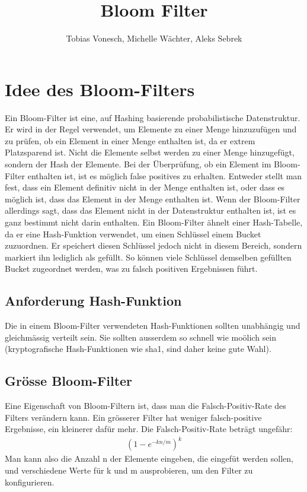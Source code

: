 \documentclass[11pt]{article}
\title{Bloom Filter}
\author{Tobias Vonesch, Michelle Wächter, Aleks Sebrek}
\begin{document}
    \maketitle

    \section{Idee des Bloom-Filters}

    Ein Bloom-Filter ist eine, auf Hashing basierende probabilistische Datenstruktur.
    Er wird in der Regel verwendet, um Elemente zu einer Menge hinzuzuf{\"u}gen und zu pr{\"u}fen, ob ein Element in einer Menge enthalten ist, da er extrem Platzsparend ist.
    Nicht die Elemente selbst werden zu einer Menge hinzugef{\"u}gt, sondern der Hash der Elemente.
    \smallskip
    Bei der {\"U}berpr{\"u}fung, ob ein Element im Bloom-Filter enthalten ist, ist es m{\"o}glich false positives zu erhalten.
    Entweder stellt man fest, dass ein Element definitiv nicht in der Menge enthalten ist, oder dass es m{\"o}glich ist, dass das Element in der Menge enthalten ist.
    Wenn der Bloom-Filter allerdings sagt, dass das Element nicht in der Datenstruktur enthalten ist, ist es ganz bestimmt nicht darin enthalten.
    \smallskip
    Ein Bloom-Filter {\"a}hnelt einer Hash-Tabelle, da er eine Hash-Funktion verwendet, um einen Schl{\"u}ssel einem Bucket zuzuordnen.
    Er speichert diesen Schl{\"u}ssel jedoch nicht in diesem Bereich, sondern markiert ihn lediglich als gef{\"u}llt.
    So k{\"o}nnen viele Schl{\"u}ssel demselben gef{\"u}llten Bucket zugeordnet werden, was zu falsch positiven Ergebnissen f{\"u}hrt.

    \subsection{Anforderung Hash-Funktion}
    Die in einem Bloom-Filter verwendeten Hash-Funktionen sollten unabh{\"a}ngig und gleichm{\"a}ssig verteilt sein.
    Sie sollten ausserdem so schnell wie mo{\"o}lich sein (kryptografische Hash-Funktionen wie sha1, sind daher keine gute Wahl).

    \subsection{Grösse Bloom-Filter}
    Eine Eigenschaft von Bloom-Filtern ist, dass man die Falsch-Positiv-Rate des Filters ver{\"a}ndern kann.
    Ein gr{\"o}sserer Filter hat weniger falsch-positive Ergebnisse, ein kleinerer daf{\"u}r mehr.
    Die Falsch-Positiv-Rate betr{\"a}gt ungef{\"a}hr:
    \begin{align*}
    (1-e^{-kn/m})^k
    \end{align*}
    Man kann also die Anzahl n der Elemente eingeben, die eingef{\"u}t werden sollen, und verschiedene Werte f{\"u}r k und m ausprobieren, um den Filter zu konfigurieren.
\end{document}
